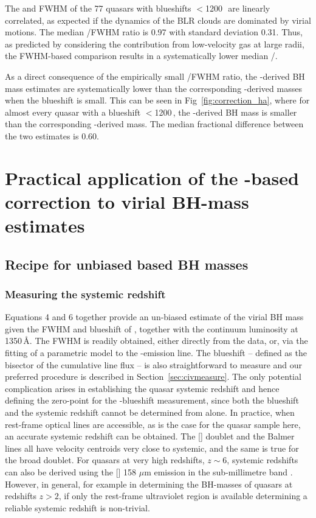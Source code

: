 The \ha and  FWHM of the 77 quasars with  blueshifts $<$1200\,\kms\, are linearly correlated, as expected if the dynamics of the BLR clouds are dominated by virial motions. 
The median /\ha FWHM ratio is 0.97 with standard deviation 0.31. 
Thus, as predicted by considering the contribution from low-velocity gas at large radii, the FWHM-based comparison results in a systematically lower median /\hans.

As a direct consequence of the empirically small /\ha FWHM ratio, the -derived BH mass estimates are systematically lower than the corresponding \hans-derived masses when the blueshift is small.
This can be seen in Fig~\ref{fig:correction_ha}, where for almost every quasar with a  blueshift $<$1200\,\kms, the -derived BH mass is smaller than the corresponding \hans-derived mass.
The median fractional difference between the two estimates is 0.60.  

\section{Practical application of the -based correction to virial BH-mass estimates}

\subsection{Recipe for unbiased  based BH masses}
\label{sec:recipe}

\subsubsection{Measuring the systemic redshift}

Equations 4 and 6 together provide an un-biased estimate of the virial BH mass given the FWHM and blueshift of , together with the continuum luminosity at 1350\,\AA. 
The FWHM is readily obtained, either directly from the data, or, via the fitting of a parametric model to the -emission line. 
The blueshift -- defined as the bisector of the cumulative line flux -- is also straightforward to measure and our preferred procedure is described in Section~\ref{sec:civmeasure}.
The only potential complication arises in establishing the quasar systemic redshift and hence defining the zero-point for the -blueshift measurement, since both the blueshift and the systemic redshift cannot be determined from  alone. 
In practice, when rest-frame optical lines are accessible, as is the case for the quasar sample here, an accurate systemic redshift can be obtained. 
The [] doublet and the Balmer lines all have velocity centroids very close to systemic, and the same is true for the broad  doublet. 
For quasars at very high redshifts, $z\sim6$, systemic redshifts can also be derived using the [] 158 $\mu$m emission in the sub-millimetre band \citep[e.g.][]{venemans16}. 
However, in general, for example in determining the BH-masses of quasars at redshifts $z>2$, if only the rest-frame ultraviolet region is available determining a reliable systemic redshift is non-trivial. 

